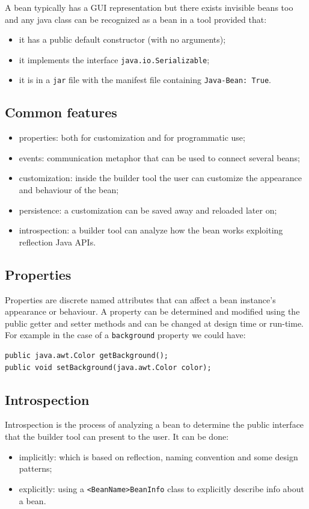 A bean typically has a GUI representation but there exists invisible beans too and any java class can be recognized as a bean in a tool provided that:
\begin{itemize}
    \item it has a public default constructor (with no arguments);
    \item it implements the interface \verb|java.io.Serializable|;
    \item it is in a \verb|jar| file with the manifest file containing \verb|Java-Bean: True|.
\end{itemize}

\subsection{Common features}
\begin{itemize}
    \item properties: both for customization and for programmatic use;
    \item events: communication metaphor that can be used to connect several beans;
    \item customization: inside the builder tool the user can customize the appearance and behaviour of the bean;
    \item persistence: a customization can be saved away and reloaded later on;
    \item introspection: a builder tool can analyze how the bean works exploiting reflection Java APIs.
\end{itemize}

\subsection{Properties}
Properties are discrete named attributes that can affect a bean instance's appearance or behaviour.
A property can be determined and modified using the public getter and setter methods and can be changed at design time or run-time.
For example in the case of a \verb|background| property we could have:
\begin{verbatim}
public java.awt.Color getBackground();
public void setBackground(java.awt.Color color);
\end{verbatim}

\subsection{Introspection}
Introspection is the process of analyzing a bean to determine the public interface that the builder tool can present to the user.
It can be done:
\begin{itemize}
    \item implicitly: which is based on reflection, naming convention and some design patterns;
    \item explicitly: using a \verb|<BeanName>BeanInfo| class to explicitly describe info about a bean.
\end{itemize}


